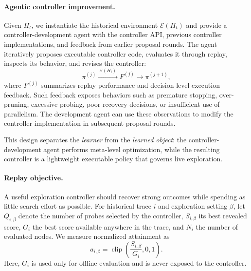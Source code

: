 \paragraph{Agentic controller improvement.}
Given $H_t$, we instantiate the historical environment
$\mathcal{E}(H_t)$ and provide a controller-development agent with the
controller API, previous controller implementations, and feedback from earlier
proposal rounds. The agent iteratively proposes executable controller code,
evaluates it through replay, inspects its behavior, and revises the controller:
\begin{equation}
    \pi^{(j)}
    \xrightarrow{\;\mathcal{E}(H_t)\;}
    F^{(j)}
    \longrightarrow
    \pi^{(j+1)},
    \label{eq:controller-learning}
\end{equation}
where $F^{(j)}$ summarizes replay performance and decision-level execution
feedback. Such feedback exposes behaviors such as premature stopping,
over-pruning, excessive probing, poor recovery decisions, or insufficient use
of parallelism. The development agent can use these observations to modify the
controller implementation in subsequent proposal rounds.

This design separates the \emph{learner} from the \emph{learned object}: the
controller-development agent performs meta-level optimization, while the
resulting controller is a lightweight executable policy that governs live
exploration.

\paragraph{Replay objective.}
A useful exploration controller should recover strong outcomes while spending
as little search effort as possible. For historical trace $i$ and exploration
setting $\beta$, let $Q_{i,\beta}$ denote the number of probes selected by the
controller, $S_{i,\beta}$ its best revealed score, $G_i$ the best score
available anywhere in the trace, and $N_i$ the number of evaluated nodes.
We measure normalized attainment as
\begin{equation}
    a_{i,\beta}
    =
    \operatorname{clip}
    \left(
        \frac{S_{i,\beta}}{G_i},0,1
    \right).
\end{equation}
Here, $G_i$ is used only for offline evaluation and is never exposed to the
controller.

